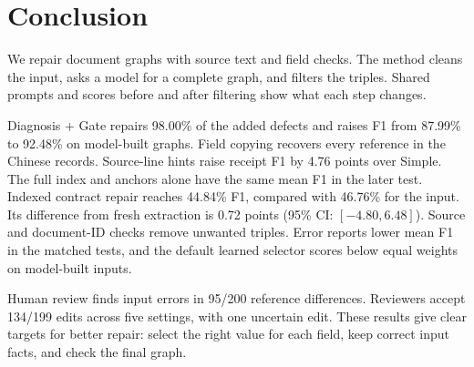 \section{Conclusion}
\label{sec:conclusion}

We repair document graphs with source text and field checks.
The method cleans the input, asks a model for a complete graph, and filters
the triples. Shared prompts and scores before and after filtering show
what each step changes.

Diagnosis + Gate repairs 98.00\% of the added defects and raises F1 from
87.99\% to 92.48\% on model-built graphs. Field copying recovers every
reference in the Chinese records. Source-line hints raise receipt F1 by
4.76 points over Simple. The full index and anchors alone have the same
mean F1 in the later test. Indexed contract repair reaches 44.84\% F1,
compared with 46.76\% for the input. Its difference from fresh extraction
is 0.72 points (95\% CI: $[-4.80,6.48]$).
Source and document-ID checks remove unwanted triples.
Error reports lower mean F1 in the matched tests, and the default learned
selector scores below equal weights on model-built inputs.

Human review finds input errors in 95/200 reference differences.
Reviewers accept 134/199 edits across five settings, with one uncertain edit.
These results give clear targets for better repair: select the right value
for each field, keep correct input facts, and check the final graph.
